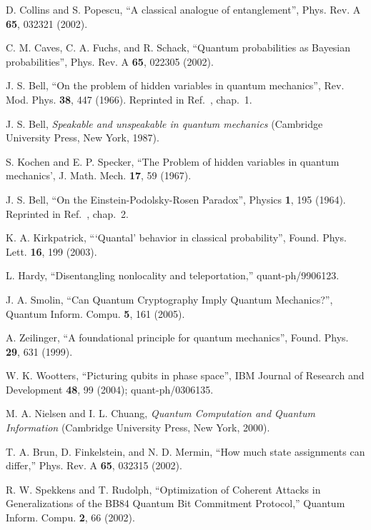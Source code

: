 \documentclass[pra,twocolumn,nofootinbib,showpacs]{revtex4}
\begin{document}
\begin{thebibliography}{99}
 D. Collins and S. Popescu, ``A classical analogue of
entanglement'', Phys. Rev. A \textbf{65}, 032321 (2002).

 C. M. Caves, C. A. Fuchs, and R. Schack, ``Quantum
probabilities as Bayesian probabilities'', Phys. Rev. A \textbf{65}, 022305
(2002).

 J. S. Bell, ``On the problem of hidden variables in quantum
mechanics'', Rev. Mod. Phys. \textbf{38}, 447 (1966). Reprinted in Ref.~\cite%
{Bellbook}, chap.~1.

 J. S. Bell, \textit{Speakable and unspeakable in quantum
mechanics} (Cambridge University Press, New York, 1987).

 S. Kochen and E. P. Specker, ``The Problem of hidden
variables in quantum mechanics', J. Math. Mech. \textbf{17}, 59 (1967).

 J. S. Bell, ``On the Einstein-Podolsky-Rosen Paradox'',
Physics \textbf{1}, 195 (1964). Reprinted in Ref.~\cite{Bellbook}, chap.~2.



 K. A. Kirkpatrick, ```Quantal' behavior in classical
probability'', Found. Phys. Lett. \textbf{16}, 199 (2003).

 L. Hardy, ``Disentangling nonlocality and
teleportation,'' quant-ph/9906123.

 J. A. Smolin, ``Can Quantum Cryptography Imply Quantum
Mechanics?'', Quantum Inform. Compu. \textbf{5}, 161 (2005).

 A. Zeilinger, ``A foundational principle for quantum
mechanics'', Found. Phys. \textbf{29}, 631 (1999).

 W. K. Wootters, ``Picturing qubits in
phase space'', IBM Journal of Research and Development
\textbf{48}, 99 (2004); quant-ph/0306135.


 M. A. Nielsen and I. L. Chuang, \textit{Quantum
Computation and Quantum Information} (Cambridge University Press, New York,
2000).

 T. A. Brun, D. Finkelstein, and N. D. Mermin, ``How much state
assignments can differ,'' Phys. Rev. A \textbf{65}, 032315 (2002).

 R. W. Spekkens and T. Rudolph, ``Optimization
of Coherent Attacks in Generalizations of the BB84 Quantum Bit
Commitment Protocol,'' Quantum Inform. Compu. \textbf{2}, 66
(2002).


\end{thebibliography}
\end{document}
